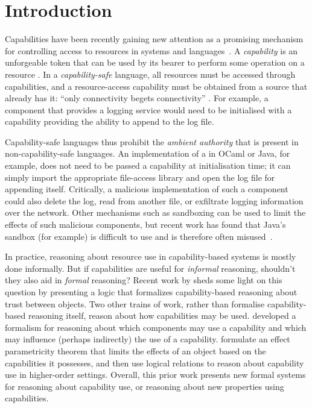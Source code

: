 \section{Introduction}

Capabilities have been recently gaining new attention as a promising mechanism for controlling access to resources in systems and languages~\cite{miller03,drossopoulou07,dimoulas14,devriese16}.
A \textit{capability} is an unforgeable token that can be used by its bearer to perform some operation on a resource \cite{dennis66}.
In a \textit{capability-safe} language, all resources must be accessed through capabilities, and a resource-access capability must be obtained from a source that already has it: ``only connectivity begets connectivity'' \cite{miller03}.
For example, a  component that provides a logging service would need to be initialised with a capability providing the ability to append to the log file.

Capability-safe languages thus prohibit the \textit{ambient authority} that is present in non-capability-safe languages.
An implementation of a  in OCaml or Java, for example, does not need to be passed a capability at initialisation time; it can simply import the appropriate file-access library and open the log file for appending itself.
Critically, a malicious implementation of such a component could also delete the log, read from another file, or exfiltrate logging information over the network.
Other mechanisms such as sandboxing can be used to limit the effects of such malicious components, but recent work has found that Java's sandbox (for example) is difficult to use and is therefore often misused~\cite{coker15, maass16}.

In practice, reasoning about resource use in capability-based systems is mostly done informally.
But if capabilities are useful for \textit{informal} reasoning, shouldn't they also aid in \textit{formal} reasoning?
Recent work by \citet{drossopoulou07} sheds some light on this question by presenting a logic that formalizes capability-based reasoning about trust between objects.
Two other trains of work, rather than formalise capability-based reasoning itself, reason about how capabilities may be used.
\citet{dimoulas14} developed a formalism for reasoning about which components may use a capability and which may influence (perhaps indirectly) the use of a capability.
\citet{devriese16} formulate an effect parametricity theorem that limits the effects of an object based on the capabilities it possesses, and then use logical relations to reason about capability use in higher-order settings.
Overall, this prior work presents new formal systems for reasoning about capability use, or reasoning about new properties using capabilities.

